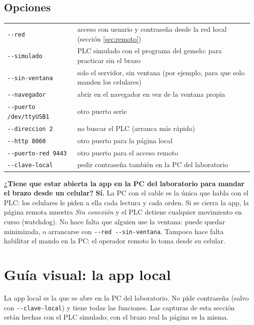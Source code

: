 \documentclass[a4paper,11pt]{article}
\newcommand{\codigo}[1]{\texttt{#1}}
\newcommand{\nota}[1]{\par\smallskip\noindent\colorbox{gris}{\parbox{\dimexpr\linewidth-2\fboxsep}{#1}}\par\smallskip}
\begin{document}
\subsection{Opciones}
\begin{center}\small
\begin{tabular}{@{}ll@{}}
\toprule
\codigo{-{}-red} & acceso con usuario y contraseña desde la red local (sección \ref{sec:remoto})\\
\codigo{-{}-simulado} & PLC simulado con el programa del gemelo: para practicar sin el brazo\\
\codigo{-{}-sin-ventana} & solo el servidor, sin ventana (por ejemplo, para que solo manden los celulares)\\
\codigo{-{}-navegador} & abrir en el navegador en vez de la ventana propia\\
\codigo{-{}-puerto /dev/ttyUSB1} & otro puerto serie\\
\codigo{-{}-direccion 2} & no buscar el PLC (arranca más rápido)\\
\codigo{-{}-http 8060} & otro puerto para la página local\\
\codigo{-{}-puerto-red 9443} & otro puerto para el acceso remoto\\
\codigo{-{}-clave-local} & pedir contraseña también en la PC del laboratorio\\
\bottomrule
\end{tabular}
\end{center}

\nota{\textbf{¿Tiene que estar abierta la app en la PC del laboratorio para mandar el brazo desde un celular?} \textbf{Sí.} La PC con el cable es la única que habla con el PLC: los celulares le piden a ella cada lectura y cada orden. Si se cierra la app, la página remota muestra \emph{Sin conexión} y el PLC detiene cualquier movimiento en curso (watchdog). No hace falta que alguien use la ventana: puede quedar minimizada, o arrancarse con \codigo{-{}-red -{}-sin-ventana}. Tampoco hace falta habilitar el mando en la PC: el operador remoto lo toma desde su celular.}

\section{Guía visual: la app local}\label{sec:local}

La app local es la que se abre en la PC del laboratorio. No pide contraseña (salvo con \codigo{-{}-clave-local}) y tiene todas las funciones. Las capturas de esta sección están hechas con el PLC simulado; con el brazo real la página es la misma.
\end{document}
